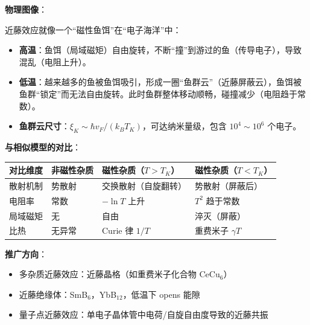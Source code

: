 \begin{insightbox}[物理图像与模型关联]
\textbf{物理图像}：

近藤效应就像一个``磁性鱼饵''在``电子海洋''中：
\begin{itemize}[nosep]
    \item \textbf{高温}：鱼饵（局域磁矩）自由旋转，不断``撞''到游过的鱼（传导电子），导致混乱（电阻上升）。
    \item \textbf{低温}：越来越多的鱼被鱼饵吸引，形成一圈``鱼群云''（近藤屏蔽云），鱼饵被鱼群``锁定''而无法自由旋转。此时鱼群整体移动顺畅，碰撞减少（电阻趋于常数）。
    \item \textbf{鱼群云尺寸}：$\xi_K\sim\hbar v_F/(k_BT_K)$，可达纳米量级，包含 $10^4\sim10^6$ 个电子。
\end{itemize}

\textbf{与相似模型的对比}：
\begin{center}
\begin{tabular}{llll}
\toprule
\textbf{对比维度} & \textbf{非磁性杂质} & \textbf{磁性杂质（$T>T_K$）} & \textbf{磁性杂质（$T<T_K$）} \\
\midrule
散射机制 & 势散射 & 交换散射（自旋翻转） & 势散射（屏蔽后） \\
电阻率 & 常数 & $-\ln T$ 上升 & $T^2$ 趋于常数 \\
局域磁矩 & 无 & 自由 & 淬灭（屏蔽） \\
比热 & 无异常 & Curie 律 $1/T$ & 重费米子 $\gamma T$ \\
\bottomrule
\end{tabular}
\end{center}

\textbf{推广方向}：
\begin{itemize}[nosep]
    \item 多杂质近藤效应：近藤晶格（如重费米子化合物 CeCu$_6$）
    \item 近藤绝缘体：SmB$_6$，YbB$_{12}$，低温下 opens 能隙
    \item 量子点近藤效应：单电子晶体管中电荷/自旋自由度导致的近藤共振
\end{itemize}
\end{insightbox}


